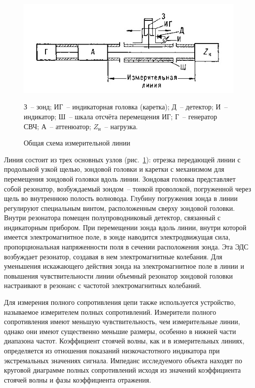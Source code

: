 \documentclass[pscyr]{hedwork}
\newcommand{\Pic}[1]{\ref{pic#1}}
\newcommand{\pic}[1]{рис.~\Pic{#1}}
\begin{document}
  \begin{figure}[!t]
    \center
    \includegraphics{line}
    \caption{Общая схема измерительной линии}
    \label{picline}
    { \small
      З~-- зонд; ИГ~-- индикаторная головка (каретка); Д~-- детектор; И~--
      индикатор; Ш~-- шкала отсчёта перемещения ИГ; Г~-- генератор СВЧ; А~--
      аттенюатор; \( Z_\text{н} \)~-- нагрузка.
    }
  \end{figure}

  Линия состоит из трех основных узлов (\pic{line}): отрезка передающей линии с
  продольной узкой щелью, зондовой головки и каретки с механизмом для
  перемещения зондовой головки вдоль линии. Зондовая головка представляет собой
  резонатор, возбуждаемый зондом~-- тонкой проволокой, погруженной через щель во
  внутреннюю полость волновода. Глубину погружения зонда в линии регулируют
  специальным винтом, расположенным сверху зондовой головки. Внутри резонатора
  помещен полупроводниковый детектор, связанный с индикаторным прибором. При
  перемещении зонда вдоль линии, внутри которой имеется электромагнитное поле,
  в зонде наводится электродвижущая сила, пропорциональная напряженности поля в
  сечении расположения зонда. Эта ЭДС возбуждает резонатор, создавая в нем
  электромагнитные колебания. Для уменьшения искажающего действия зонда на
  электромагнитное поле в линии и повышения чувствительности линии объемный
  резонатор зондовой головки настраивают в резонанс с частотой электромагнитных
  колебаний.
  
  \bigskip

  Для измерения полного сопротивления цепи также используется устройство,
  называемое измерителем полных сопротивлений. Измерители полного сопротивления
  имеют меньшую чувствительность, чем измерительные линии, однако они имеют
  существенно меньшие размеры, особенно в нижней части диапазона частот.
  Коэффициент стоячей волны, как и в измерительных линиях, определяется из
  отношения показаний низкочастотного индикатора при экстремальных значениях
  сигнала. Импеданс исследуемого объекта находят по круговой диаграмме полных
  сопротивлений исходя из значений коэффициента стоячей волны и фазы
  коэффициента отражения.
\end{document}
